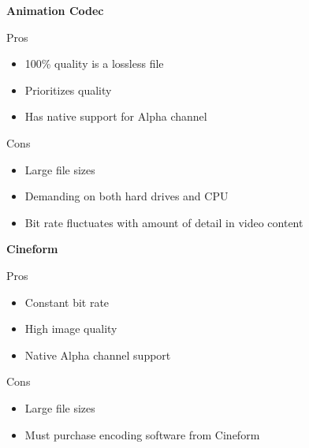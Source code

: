 \begin{fullwidth}
\vspace{6mm}

\noindent \textbf{Animation Codec}

\vspace{3mm}

Pros
\begin{itemize}
\item 100\% quality is a lossless file
\item Prioritizes quality 
\item Has native support for Alpha channel 
\end{itemize}

\vspace{3mm}

Cons
\begin{itemize}
\item Large file sizes
\item Demanding on both hard drives and CPU
\item Bit rate fluctuates with amount of detail in video content
\end{itemize}

\vspace{6mm}

\noindent \textbf{Cineform} 

\vspace{3mm}

Pros
\begin{itemize}
\item Constant bit rate
\item High image quality
\item Native Alpha channel support
\end{itemize}

\vspace{3mm}

Cons
\begin{itemize}
\item Large file sizes
\item Must purchase encoding software from Cineform
\end{itemize}


\end{fullwidth}
